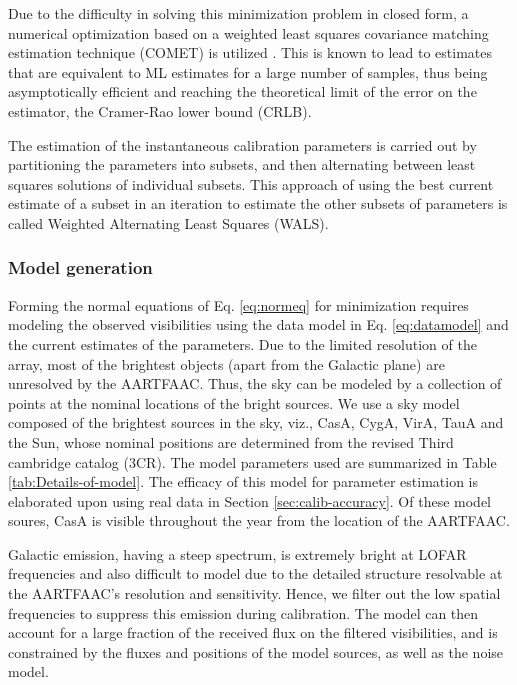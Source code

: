 \documentclass{aa}
\begin{document}
Due to  the difficulty in  solving this minimization  problem in closed  form, a
numerical  optimization based on  a weighted  least squares  covariance matching
estimation technique (COMET)  is utilized \citep{ottersten1998covariance}.  This
is known to  lead to estimates that  are equivalent to ML estimates  for a large
number  of  samples,  thus  being  asymptotically  efficient  and  reaching  the
theoretical  limit of the  error on  the estimator,  the Cramer-Rao  lower bound
(CRLB).

The estimation  of the  instantaneous calibration parameters  is carried  out by
partitioning  the parameters into  subsets, and  then alternating  between least
squares solutions of individual subsets. This approach of using the best current
estimate of a subset in an iteration to estimate the other subsets of parameters
is called Weighted Alternating Least Squares (WALS).


\subsubsection{\label{sub:Model-generation}Model generation}

Forming the  normal equations of  Eq. \ref{eq:normeq} for  minimization requires
modeling    the    observed   visibilities    using    the    data   model    in
Eq. \ref{eq:datamodel} and the current  estimates of the parameters.  Due to the
limited resolution of  the array, most of the brightest  objects (apart from the
Galactic plane) are unresolved by the AARTFAAC.  Thus, the sky can be modeled by
a collection of points at the nominal  locations of the bright sources. We use a
sky model composed of the brightest  sources in the sky, viz., CasA, CygA, VirA,
TauA and the Sun, whose nominal  positions are determined from the revised Third
cambridge  catalog (3CR).  The model  parameters  used are  summarized in  Table
\ref{tab:Details-of-model}. The efficacy of  this model for parameter estimation
is  elaborated upon  using real  data in  Section  \ref{sec:calib-accuracy}.  Of
these model soures, CasA is visible throughout the year from the location of the
AARTFAAC.

Galactic  emission,  having a  steep  spectrum,  is  extremely bright  at  LOFAR
frequencies and also difficult to model due to the detailed structure resolvable
at  the AARTFAAC's  resolution and  sensitivity. Hence,  we filter  out  the low
spatial frequencies to suppress this  emission during calibration. The model can
then  account  for  a large  fraction  of  the  received  flux on  the  filtered
visibilities,  and is  constrained  by the  fluxes  and positions  of the  model
sources, as well as the noise model. 
\end{document}
